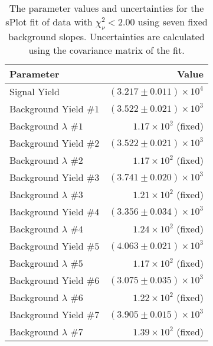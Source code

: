 
\begin{table}[ht]
    \begin{center}
        \begin{tabular}{lr}\toprule
            Parameter & Value \\\midrule
            Signal Yield & $(3.217 \pm 0.011) \times 10^{4}$ \\
            Background Yield $\#1$ & $(3.522 \pm 0.021) \times 10^{3}$ \\
            Background $\lambda$ $\#1$ & $1.17 \times 10^{2}$ (fixed) \\
            Background Yield $\#2$ & $(3.522 \pm 0.021) \times 10^{3}$ \\
            Background $\lambda$ $\#2$ & $1.17 \times 10^{2}$ (fixed) \\
            Background Yield $\#3$ & $(3.741 \pm 0.020) \times 10^{3}$ \\
            Background $\lambda$ $\#3$ & $1.21 \times 10^{2}$ (fixed) \\
            Background Yield $\#4$ & $(3.356 \pm 0.034) \times 10^{3}$ \\
            Background $\lambda$ $\#4$ & $1.24 \times 10^{2}$ (fixed) \\
            Background Yield $\#5$ & $(4.063 \pm 0.021) \times 10^{3}$ \\
            Background $\lambda$ $\#5$ & $1.17 \times 10^{2}$ (fixed) \\
            Background Yield $\#6$ & $(3.075 \pm 0.035) \times 10^{3}$ \\
            Background $\lambda$ $\#6$ & $1.22 \times 10^{2}$ (fixed) \\
            Background Yield $\#7$ & $(3.905 \pm 0.015) \times 10^{3}$ \\
            Background $\lambda$ $\#7$ & $1.39 \times 10^{2}$ (fixed) \\\bottomrule
        \end{tabular}
        \caption{The parameter values and uncertainties for the sPlot fit of data with $\chi^2_\nu < 2.00$ using seven fixed background slopes. Uncertainties are calculated using the covariance matrix of the fit.}\label{tab:splot-fit-results-chisqdof-2.00-fixed-7}
    \end{center}
\end{table}
